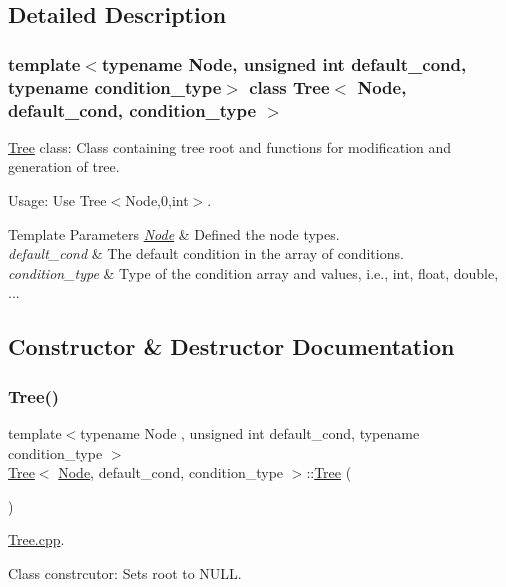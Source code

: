\subsection{Detailed Description}
\subsubsection*{template$<$typename Node, unsigned int default\+\_\+cond, typename condition\+\_\+type$>$\newline
class Tree$<$ Node, default\+\_\+cond, condition\+\_\+type $>$}

\hyperlink{class_tree}{Tree} class\+: Class containing tree root and functions for modification and generation of tree. 

Usage\+: Use {\ttfamily Tree$<$\+Node,0,int$>$}. 
\begin{DoxyTemplParams}{Template Parameters}
{\em \hyperlink{struct_node}{Node}} & Defined the node types. \\
\hline
{\em default\+\_\+cond} & The default condition in the array of conditions. \\
\hline
{\em condition\+\_\+type} & Type of the condition array and values, i.\+e., int, float, double, ... \\
\hline
\end{DoxyTemplParams}


\subsection{Constructor \& Destructor Documentation}
\mbox{\label{class_tree_a32a2cac7d7a95d1d549d528cc088660c}} 
\subsubsection{\texorpdfstring{Tree()}{Tree()}}
{\footnotesize\ttfamily template$<$typename Node , unsigned int default\+\_\+cond, typename condition\+\_\+type $>$ \\
\hyperlink{class_tree}{Tree}$<$ \hyperlink{struct_node}{Node}, default\+\_\+cond, condition\+\_\+type $>$\+::\hyperlink{class_tree}{Tree} (\begin{DoxyParamCaption}{ }\end{DoxyParamCaption})}



\hyperlink{_tree_8cpp}{Tree.\+cpp}. 

Class constrcutor\+: Sets {\ttfamily root} to N\+U\+LL.

